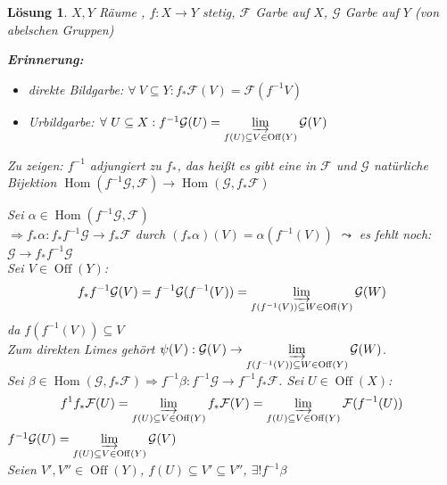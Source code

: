 \documentclass[paper = A4, fontsize=12pt, numbers=noendperiod, chapterprefix=true]{scrbook}
\theoremstyle{break}
\newtheorem{Loes}{L\"osung}
\theoremstyle{nonumberbreak}
\theoremstyle{nonumberplain}
\newcommand{\schraffiert}{\ensuremath{\nicefrac{\nicefrac{}{}}{\nicefrac{}{}}}}
\DeclareMathOperator{\Hom}{Hom}
\DeclareMathOperator{\Off}{Off}
\newcommand{\calF}{\mathcal{F}}
\newcommand{\calG}{\mathcal{G}}
\begin{document}
\begin{Loes}
$X, Y$ R\"aume , $f: X \to Y$ stetig, $\calF$ Garbe auf $X$, $\calG$ Garbe auf $Y$ (von abelschen Gruppen)

\textbf{Erinnerung:}\begin{itemize}
\item direkte Bildgarbe: $\forall\   V \subseteq Y: f_{*}\calF(V) = \calF(f^{-1} V)$
\item Urbildgarbe: $\forall\  U\subseteq X: f^{-1} \calG(U) = \varinjlim\limits_{f(U) \subseteq V \in \Off(Y)} \calG(V)$
\end{itemize}
\emph{Zu zeigen:} $f^{-1}$ adjungiert zu $f_{*}$, das hei\ss t es gibt eine in $\calF$ und $\calG$ nat\"urliche Bijektion $\Hom(f^{-1}\calG, \calF) \to \Hom(\calG, f_*\calF)$

Sei $\alpha \in \Hom(f^{-1}\calG, \calF)$\\
$\Rightarrow f_*\alpha : f_*f^{-1}\calG \to f_*\calF$ durch $(f_*\alpha)(V) = \alpha (f^{-1}(V))$ $\leadsto$ es fehlt noch: $\calG \to f_{*}f^{-1}\calG$\\
Sei $V \in \Off(Y)$:
	\[ f_{*}f^{-1}\calG(V) = f^{-1}\calG(f^{-1}(V)) = \varinjlim\limits_{f(f^{-1}(V)) \subseteq W \in \Off(Y)} \calG(W)\]
da $f(f^{-1}(V)) \subseteq V$\\
Zum direkten Limes geh\"ort $\psi(V): \calG(V) \to \varinjlim\limits_{f(f^{-1}(V)) \subseteq W \in \Off(Y)} \calG(W)$.\\
Sei $\beta \in \Hom(\calG, f_*\calF) \Rightarrow f^{-1}\beta: f^{-1}\calG \to f^{-1} f_*\calF$. Sei $U\in \Off(X)$:
	\[f^{1}f_*\calF(U) = \varinjlim\limits_{f(U) \subseteq V \in \Off(Y)} f_*\calF(V) = \varinjlim\limits_{f(U) \subseteq V \in \Off(Y)}\calF(f^{-1}(U)) \]
$f^{-1}\calG(U) = \varinjlim\limits_{f(U) \subseteq V \in \Off(Y)} \calG(V)$\\
Seien $V', V'' \in \Off(Y)$, $f(U) \subseteq V' \subseteq V''$, $\exists! f^{-1}\beta$
\begin{center}
\end{center}
\end{Loes}
\end{document}
